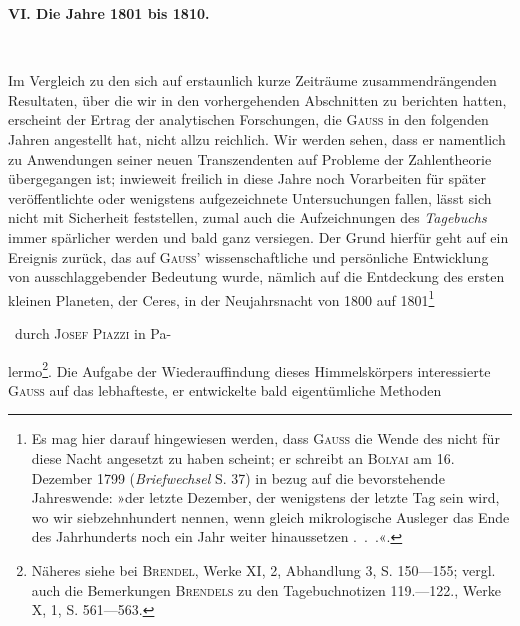 \par\bigskip
\begin{center}\large\textbf{VI. Die Jahre 1801 bis 1810.}\end{center}
\begin{center}\\
\end{center}
\noindent\hspace*{\parindent}Im Vergleich zu den sich auf erstaunlich kurze Zeiträume zusammendrängenden
Resultaten, über die wir in den vorhergehenden Abschnitten zu
berichten hatten, erscheint der Ertrag der analytischen Forschungen, die \textsc{Gauss}
in den folgenden Jahren angestellt hat, nicht allzu reichlich. Wir werden
sehen, dass er namentlich zu Anwendungen seiner neuen Transzendenten auf
Probleme der Zahlentheorie übergegangen ist; inwieweit freilich in diese Jahre
noch Vorarbeiten für später veröffentlichte oder wenigstens aufgezeichnete
Untersuchungen fallen, lässt sich nicht mit Sicherheit feststellen, zumal auch
die Aufzeichnungen des \textit{Tagebuchs} immer spärlicher werden und bald ganz
versiegen. Der Grund hierfür geht auf ein Ereignis zurück, das auf \textsc{Gauss’}
wissenschaftliche und persönliche Entwicklung von ausschlaggebender Bedeutung
wurde, nämlich auf die Entdeckung des ersten kleinen Planeten, der
Ceres, in der Neujahrsnacht von 1800 auf 1801\begingroup\renewcommand{\thefootnote}{165a)}\footnote{Es mag hier darauf hingewiesen werden, dass \textsc{Gauss} die Wende des  nicht für diese Nacht angesetzt zu haben scheint; er schreibt an \textsc{Bolyai} am 16. Dezember 1799 (\textit{Briefwechsel} S. 37) in bezug auf die bevorstehende Jahreswende: »der letzte Dezember, der wenigstens der letzte Tag sein wird, wo wir siebzehnhundert nennen, wenn gleich mikrologische Ausleger das Ende des Jahrhunderts noch ein Jahr weiter hinaussetzen .\ .\ .«.}\addtocounter{footnote}{-1}\endgroup\ durch \textsc{Josef Piazzi} in Pa-\par
\clearpage{}
\noindent lermo\footnote{Näheres siehe bei \textsc{Brendel}, Werke XI, 2, Abhandlung 3, S. 150—155; vergl. auch die Bemerkungen \textsc{Brendels} zu den Tagebuchnotizen 119.—122., Werke X, 1, S. 561—563.}. Die Aufgabe der Wiederauffindung dieses Himmelskörpers interessierte
\textsc{Gauss} auf das lebhafteste, er entwickelte bald eigentümliche Methoden
